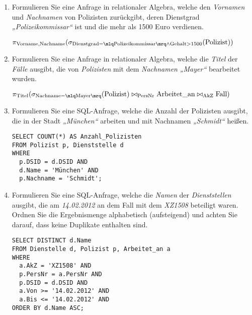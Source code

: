 \documentclass{lehramt-informatik-minimal}
\begin{document}
\begin{enumerate}


\item Formulieren Sie eine Anfrage in relationaler Algebra, welche den
\emph{Vornamen} und \emph{Nachnamen} von Polizisten zurückgibt, deren
Dienstgrad \emph{„Polizeikommissar“} ist und die mehr als 1500 Euro
verdienen.

\begin{antwort}
$\pi_{\text{Vorname,Nachname}}(
  \sigma_{
    \text{Dienstgrad} = \mlq \text{Polizeikommissar} \mrq
      \land
    \text{Gehalt} > 1500
  }(\text{Polizist})
)$
\end{antwort}


\item Formulieren Sie eine Anfrage in relationaler Algebra, welche die
\emph{Titel} der \emph{Fälle} ausgibt, die von \emph{Polizisten} mit dem
\emph{Nachnamen} \emph{„Mayer“} bearbeitet wurden.

\begin{antwort}
$
\pi_{\text{Titel}}(
  \sigma_{\text{Nachname} = \mlq \text{Mayer} \mrq}(\text{Polizist})
  \bowtie_{\text{PersNr}}
  \text{Arbeitet\_an}
  \bowtie_{\text{AkZ}}
  \text{Fall}
)
$
\end{antwort}


\item Formulieren Sie eine SQL-Anfrage, welche die Anzahl der
Polizisten ausgibt, die in der Stadt \emph{„München“} arbeiten und mit
Nachnamen \emph{„Schmidt“} heißen.

\begin{antwort}
\begin{verbatim}
SELECT COUNT(*) AS Anzahl_Polizisten
FROM Polizist p, Dienststelle d
WHERE
  p.DSID = d.DSID AND
  d.Name = 'München' AND
  p.Nachname = 'Schmidt';
\end{verbatim}
\end{antwort}


\item Formulieren Sie eine SQL-Anfrage, welche die \emph{Namen} der
\emph{Dienststellen} ausgibt, die am \emph{14.02.2012} an dem Fall mit
dem \emph{XZ1508} beteiligt waren. Ordnen Sie die Ergebnismenge
alphabetisch (aufsteigend) und achten Sie darauf, dass keine Duplikate
enthalten sind.

\begin{antwort}
\begin{verbatim}
SELECT DISTINCT d.Name
FROM Dienstelle d, Polizist p, Arbeitet_an a
WHERE
  a.AkZ = 'XZ1508' AND
  p.PersNr = a.PersNr AND
  p.DSID = d.DSID AND
  a.Von >= '14.02.2012' AND
  a.Bis <= '14.02.2012' AND
ORDER BY d.Name ASC;
\end{verbatim}
\end{antwort}


\end{enumerate}
\end{document}
